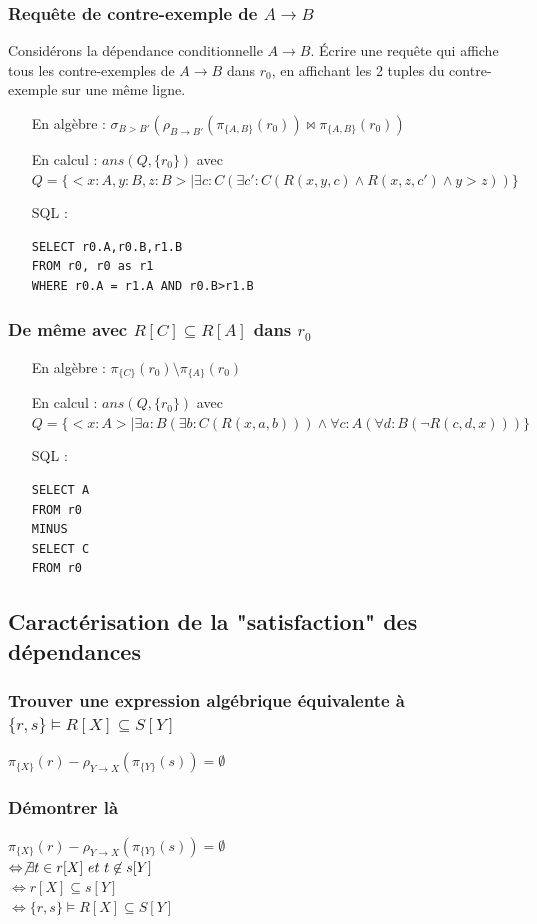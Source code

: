 \documentclass[10pt,a4paper,twoside]{article}
\begin{document}
\subsubsection{Requête de contre-exemple de $A\rightarrow B$}
Considérons la dépendance conditionnelle $A\rightarrow B$. Écrire une requête qui affiche tous les contre-exemples de $A\rightarrow B$ dans $r_{0}$, en affichant les 2 tuples du contre-exemple sur une même ligne.
\begin{enumerate}
\item[En algèbre :] $\sigma_{B > B'}(\rho_{B\rightarrow B'}(\pi_{\{A,B\}}(r_{0})) \bowtie \pi_{\{A,B\}}(r_{0}))$
\item[En calcul :] $ans(Q,\{r_{0}\})$ avec $Q=\{<x:A,y:B,z:B> \mid \exists c:C(\exists c':C(R(x,y,c) \wedge R(x,z,c') \wedge y>z))\}$
\item[SQL :] 
\begin{verbatim}
SELECT r0.A,r0.B,r1.B 
FROM r0, r0 as r1 
WHERE r0.A = r1.A AND r0.B>r1.B
\end{verbatim} 
\end{enumerate}

\subsubsection{De même avec $R[C] \subseteq R[A]$ dans $r_{0}$}
\begin{enumerate}
\item[En algèbre :] $\pi_{\{C\}}(r_{0}) \setminus \pi_{\{A\}}(r_{0})$
\item[En calcul :] $ans(Q,\{r_{0}\})$ avec $Q=\{<x:A> \mid \exists a:B(\exists b:C(R(x,a,b))) \wedge \forall c:A(\forall d:B(\neg R(c,d,x)))\}$
\item[SQL :] 
\begin{verbatim}
SELECT A
FROM r0 
MINUS
SELECT C
FROM r0
\end{verbatim} 
\end{enumerate}

\subsection{Caractérisation de la "satisfaction" des dépendances}
\subsubsection{Trouver une expression algébrique équivalente à $\{r,s\} \models R[X] \subseteq S[Y]$}
$\pi_{\{X\}}(r) - \rho_{Y \rightarrow X}(\pi_{\{Y\}}(s)) = \emptyset$
\subsubsection{Démontrer là}
$\pi_{\{X\}}(r) - \rho_{Y \rightarrow X}(\pi_{\{Y\}}(s)) = \emptyset$\\
$\Leftrightarrow \not\exists t \in r[X]\ et\ t \not\in s[Y]$\\
$\Leftrightarrow r[X] \subseteq s[Y] $\\
$\Leftrightarrow \{r,s\} \models R[X] \subseteq S[Y]$
\end{document}
